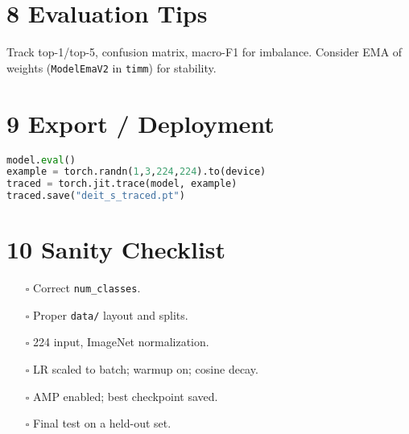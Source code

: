 \documentclass[11pt]{article}
\begin{document}
\section*{8 Evaluation Tips}
Track top-1/top-5, confusion matrix, macro-F1 for imbalance. Consider EMA of weights (\texttt{ModelEmaV2} in \texttt{timm}) for stability.

\section*{9 Export / Deployment}
\begin{lstlisting}[language=python,style=code]
model.eval()
example = torch.randn(1,3,224,224).to(device)
traced = torch.jit.trace(model, example)
traced.save("deit_s_traced.pt")
\end{lstlisting}

\section*{10 Sanity Checklist}
\begin{itemize}[leftmargin=1.3em]
  \item[\(\square\)] Correct \texttt{num\_classes}.
  \item[\(\square\)] Proper \texttt{data/} layout and splits.
  \item[\(\square\)] 224 input, ImageNet normalization.
  \item[\(\square\)] LR scaled to batch; warmup on; cosine decay.
  \item[\(\square\)] AMP enabled; best checkpoint saved.
  \item[\(\square\)] Final test on a held-out set.
\end{itemize}
\end{document}

